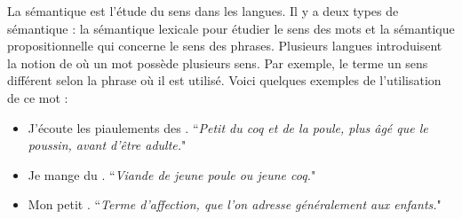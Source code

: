 \documentclass{KodeBook}
\begin{document}
La sémantique est l'étude du sens dans les langues. 
Il y a deux types de sémantique : la sémantique lexicale pour étudier le sens des mots et la sémantique propositionnelle qui concerne le sens des phrases.
Plusieurs langues introduisent la notion de  où un mot possède plusieurs sens.
Par exemple, le terme  un sens différent selon la phrase où il est utilisé. 
Voici quelques exemples de l'utilisation de ce mot :
\begin{itemize}
	\item J'écoute les piaulements des . ``\textit{Petit du coq et de la poule, plus âgé que le poussin, avant d'être adulte.}"
	\item Je mange du . ``\textit{Viande de jeune poule ou jeune coq.}"
	\item Mon petit . ``\textit{Terme d'affection, que l'on adresse généralement aux enfants.}"
\end{itemize}
\end{document}

